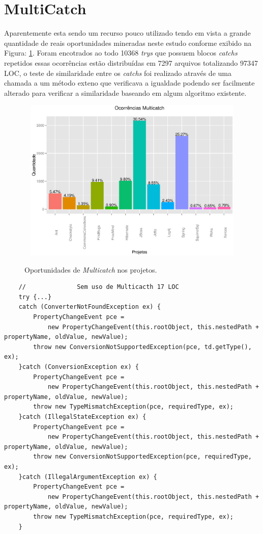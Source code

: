 \section{MultiCatch}
Aparentemente esta sendo um recurso pouco utilizado tendo em vista a grande quantidade de reais oportunidades mineradas neste estudo conforme exibido na Figura: \ref{fig:Muticatch}. Foram encotrados ao todo 10368 \textit{trys} que possuem blocos \textit{catchs} repetidos essas ocorrências estão distribuídas em 7297 arquivos totalizando 97347 \acs{LOC}, o teste de  similaridade entre os \textit{catchs} foi realizado através de uma chamada a um método exteno que verificava a igualdade podendo ser facilmente alterado para verificar a similaridade baseando em algum algoritmo existente.

\begin{figure}[h]
	\center
	\includegraphics[width=13cm,height=7.8cm]{Imagens/ocorrenciasMulticatch}
	\label{fig:Muticatch}
	\caption{Oportunidades de \textit{Multicatch} nos projetos.}
\end{figure}
		

\begin{lstlisting}
	//              Sem uso de Multicacth 17 LOC
	try {...}
	catch (ConverterNotFoundException ex) {
		PropertyChangeEvent pce =
			new PropertyChangeEvent(this.rootObject, this.nestedPath + propertyName, oldValue, newValue);
		throw new ConversionNotSupportedException(pce, td.getType(), ex);
	}catch (ConversionException ex) {
		PropertyChangeEvent pce =
			new PropertyChangeEvent(this.rootObject, this.nestedPath + propertyName, oldValue, newValue);
		throw new TypeMismatchException(pce, requiredType, ex);
	}catch (IllegalStateException ex) {
		PropertyChangeEvent pce =
			new PropertyChangeEvent(this.rootObject, this.nestedPath + propertyName, oldValue, newValue);
		throw new ConversionNotSupportedException(pce, requiredType, ex);
	}catch (IllegalArgumentException ex) {
		PropertyChangeEvent pce =
			new PropertyChangeEvent(this.rootObject, this.nestedPath + propertyName, oldValue, newValue);
		throw new TypeMismatchException(pce, requiredType, ex);
	}
\end{lstlisting}


